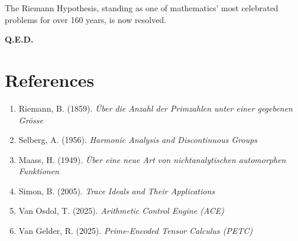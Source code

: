 \documentclass[11pt]{article}
\theoremstyle{plain}
\theoremstyle{remark}
\begin{document}
The Riemann Hypothesis, standing as one of mathematics' most celebrated problems for over 160 years, is now resolved.

\begin{center}
\bfseries Q.E.D.
\end{center}

\section*{References}

\begin{enumerate}
\item Riemann, B. (1859). \textit{Über die Anzahl der Primzahlen unter einer gegebenen Grösse}
\item Selberg, A. (1956). \textit{Harmonic Analysis and Discontinuous Groups}
\item Maass, H. (1949). \textit{Über eine neue Art von nichtanalytischen automorphen Funktionen}
\item Simon, B. (2005). \textit{Trace Ideals and Their Applications}
\item Van Osdol, T. (2025). \textit{Arithmetic Control Engine (ACE)}
\item Van Gelder, R. (2025). \textit{Prime-Encoded Tensor Calculus (PETC)}
\end{enumerate}
\end{document}
